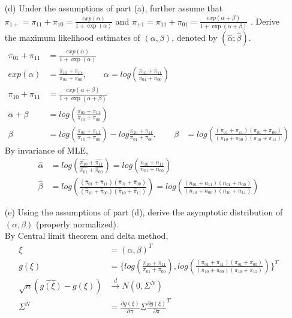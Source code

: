 \documentclass[11pt]{article} %
\begin{document}
\begin{itemize}
	\item[(d)] Under the assumptions of part (a), further assume that$ \pi_{1+} = \pi_{11} + \pi_{10} = \frac{exp(\alpha)}{1+\exp(\alpha)} $ and $ \pi_{+1} = \pi_{11} + \pi_{01} = \frac{exp(\alpha + \beta)}{1+\exp(\alpha + \beta)} $ . Derive the maximum likelihood estimates of $(\alpha, \beta)$, denoted by $(\hat{\alpha}; \hat{\beta})$.\\
	\begin{align*}
		\pi_{01} + \pi_{11} & = \frac{exp(\alpha)}{1+\exp(\alpha)} \\
		exp(\alpha) &= \frac{\pi_{10} + \pi_{11}}{\pi_{01} + \pi_{00}}, \qquad \alpha = log \left( \frac{\pi_{10} + \pi_{11}}{\pi_{01} + \pi_{00}}\right)\\
		\pi_{10}+ \pi_{11} & = \frac{exp(\alpha + \beta)}{1+\exp(\alpha + \beta)} \\
		\alpha + \beta &= log \left( \frac{\pi_{01} + \pi_{11}}{\pi_{10} + \pi_{00}} \right)\\
		\beta &= log \left( \frac{\pi_{01} + \pi_{11}}{\pi_{10} + \pi_{00}} \right) - log \frac{\pi_{10} + \pi_{11}}{\pi_{01} + \pi_{00}}, \qquad \beta &= log \left(\frac{(\pi_{01} + \pi_{11})(\pi_{01} + \pi_{00})}{(\pi_{10} + \pi_{00}) (\pi_{10} + \pi_{11})} \right)
	\end{align*}
	By invariance of MLE,
	\begin{align*}
		\hat\alpha &= log \left( \frac{\hat{\pi_{10}} + \hat{\pi_{11}}}{\hat{\pi_{01}} + \hat{\pi_{00}}}\right) = log \left(\frac{n_{10} + n_{11}}{n_{01} + n_{00}} \right)\\
		\hat\beta &= log \left(\frac{(\hat\pi_{01} + \hat\pi_{11})(\hat\pi_{01} + \hat\pi_{00})}{(\hat\pi_{10} + \hat\pi_{00}) (\hat\pi_{10} + \hat\pi_{11})} \right) = log \left(\frac{(n_{01} + n_{11})(n_{01} + n_{00})}{(n_{10} + n_{00}) (n_{10} + n_{11})} \right)
	\end{align*}
	\item[(e)] Using the assumptions of part (d), derive the asymptotic distribution of $(\alpha, \beta)$ (properly normalized).\\
	By Central limit theorem and delta method,
	\begin{align*}
		\xi &= (\alpha, \beta)^T \\
		g(\xi) &= \{ log \left( \frac{\pi_{10} + \pi_{11}}{\pi_{01} + \pi_{00}}\right), log \left(\frac{(\pi_{01} + \pi_{11})(\pi_{01} + \pi_{00})}{(\pi_{10} + \pi_{00}) (\pi_{10} + \pi_{11})} \right)\}^T \\
		\sqrt{n} (\hat{g(\xi)} - g(\xi)) & \xrightarrow[]{d} N \left(0, \Sigma^{N} \right) \\
		\Sigma^{N} &= \frac{\partial g(\xi)}{\partial \pi} \Sigma \frac{\partial g(\xi)}{\partial \pi}^T
	\end{align*}
	

\end{itemize}
\end{document}

